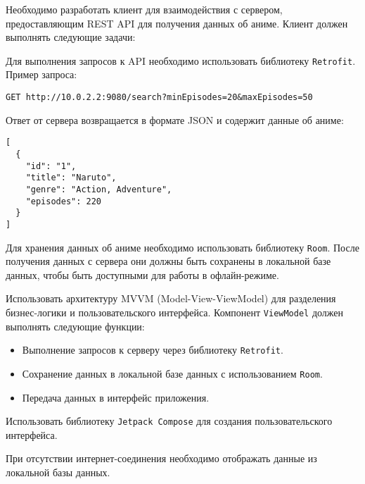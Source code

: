 
Необходимо разработать клиент для взаимодействия с сервером, предоставляющим REST API для получения данных об аниме. Клиент должен выполнять следующие задачи:


Для выполнения запросов к API необходимо использовать библиотеку \texttt{Retrofit}. Пример запроса:

\begin{verbatim}
GET http://10.0.2.2:9080/search?minEpisodes=20&maxEpisodes=50
\end{verbatim}

Ответ от сервера возвращается в формате JSON и содержит данные об аниме:

\begin{verbatim}
[
  {
    "id": "1",
    "title": "Naruto",
    "genre": "Action, Adventure",
    "episodes": 220
  }
]
\end{verbatim}

Для хранения данных об аниме необходимо использовать библиотеку \texttt{Room}. После получения данных с сервера они должны быть сохранены в локальной базе данных, чтобы быть доступными для работы в офлайн-режиме.

Использовать архитектуру MVVM (Model-View-ViewModel) для разделения бизнес-логики и пользовательского интерфейса. Компонент \texttt{ViewModel} должен выполнять следующие функции:
\begin{itemize}
    \item Выполнение запросов к серверу через библиотеку \texttt{Retrofit}.
    \item Сохранение данных в локальной базе данных с использованием \texttt{Room}.
    \item Передача данных в интерфейс приложения.
\end{itemize}

Использовать библиотеку \texttt{Jetpack Compose} для создания пользовательского интерфейса.


При отсутствии интернет-соединения необходимо отображать данные из локальной базы данных.
